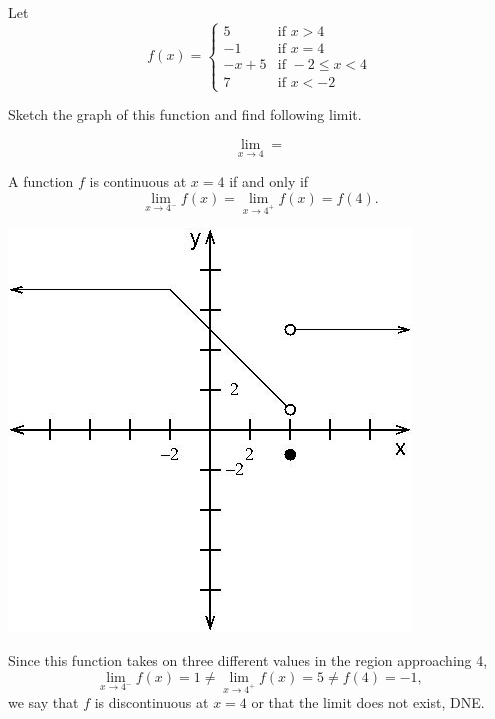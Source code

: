 \documentclass{ximera}
\author{Emma Smith Zbarsky}
\begin{document}
\begin{exercise}

Let
\[f(x) = \begin{cases} 5 & \mbox{if } x>4 \\ -1 & \mbox{if } x=4 \\ -x+5 & \mbox{if } -2\leq x < 4 \\ 7 & \mbox{if } x<-2 \end{cases}\]

Sketch the graph of this function and find following limit.

\[\lim_{x \to 4} = \]


\begin{hint}
A function $f$ is continuous at $x=4$ if and only if
\[\lim_{x\to 4^-} f(x) = \lim_{x\to 4^+} f(x) = f(4).\]
\end{hint}


\begin{hint}
\begin{image}\includegraphics{piecewise.jpg}\end{image}

 Since this function takes on three different
values in the region approaching 4,
\[\lim_{x\to 4^-} f(x) = 1 \neq \lim_{x\to 4^+} f(x) = 5 \neq f(4) = -1,\]
we say that $f$ is discontinuous at $x=4$ or that the limit does not
exist, DNE.
\end{hint}


\begin{multipleChoice}
\end{multipleChoice}

\end{exercise}
\end{document}
